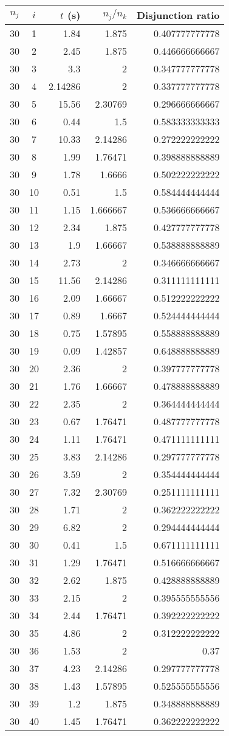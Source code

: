 \documentclass[13pt, letterpaper, oneside]{book}
\begin{document}
\begin{tabular}{c c r r r}
\toprule
$n_j$ & $i$ & $t$ (s) & $n_j/n_k$ & Disjunction ratio \\
\midrule
30&1&1.84&1.875&0.407777777778\\
30&2&2.45&1.875&0.446666666667\\
30&3&3.3&2&0.347777777778\\
30&4&2.14286&2&0.337777777778\\
30&5&15.56&2.30769&0.296666666667\\
30&6&0.44&1.5&0.583333333333\\
30&7&10.33&2.14286&0.272222222222\\
30&8&1.99&1.76471&0.398888888889\\
30&9&1.78&1.6666&0.502222222222\\
30&10&0.51&1.5&0.584444444444\\
30&11&1.15&1.666667&0.536666666667\\
30&12&2.34&1.875&0.427777777778\\
30&13&1.9&1.66667&0.538888888889\\
30&14&2.73&2&0.346666666667\\
30&15&11.56&2.14286&0.311111111111\\
30&16&2.09&1.66667&0.512222222222\\
30&17&0.89&1.6667&0.524444444444\\
30&18&0.75&1.57895&0.558888888889\\
30&19&0.09&1.42857&0.648888888889\\
30&20&2.36&2&0.397777777778\\
30&21&1.76&1.66667&0.478888888889\\
30&22&2.35&2&0.364444444444\\
30&23&0.67&1.76471&0.487777777778\\
30&24&1.11&1.76471&0.471111111111\\
30&25&3.83&2.14286&0.297777777778\\
30&26&3.59&2&0.354444444444\\
30&27&7.32&2.30769&0.251111111111\\
30&28&1.71&2&0.362222222222\\
30&29&6.82&2&0.294444444444\\
30&30&0.41&1.5&0.671111111111\\
30&31&1.29&1.76471&0.516666666667\\
30&32&2.62&1.875&0.428888888889\\
30&33&2.15&2&0.395555555556\\
30&34&2.44&1.76471&0.392222222222\\
30&35&4.86&2&0.312222222222\\
30&36&1.53&2&0.37\\
30&37&4.23&2.14286&0.297777777778\\
30&38&1.43&1.57895&0.525555555556\\
30&39&1.2&1.875&0.348888888889\\
30&40&1.45&1.76471&0.362222222222\\
\bottomrule
\end{tabular}
\backmatter
\pagebreak
\thispagestyle{empty}
\vspace*{\fill}
\end{document}
